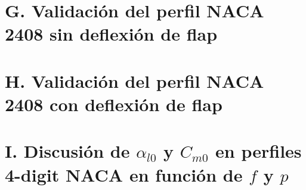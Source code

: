 \section*{G. Validación del perfil NACA 2408 sin deflexión de flap}


\section*{H. Validación del perfil NACA 2408 con deflexión de flap}


\section*{I. Discusión de $\alpha_{l0}$ y $C_{m0}$ en perfiles 4-digit NACA en función de $f$ y $p$}

